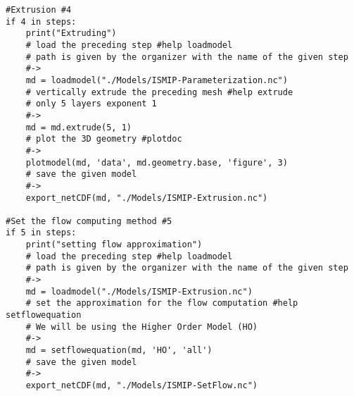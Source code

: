 \begin{verbatim}
#Extrusion #4
if 4 in steps:
    print("Extruding")
    # load the preceding step #help loadmodel
    # path is given by the organizer with the name of the given step
    #->
    md = loadmodel("./Models/ISMIP-Parameterization.nc")
    # vertically extrude the preceding mesh #help extrude
    # only 5 layers exponent 1
    #->
    md = md.extrude(5, 1)
    # plot the 3D geometry #plotdoc
    #->
    plotmodel(md, 'data', md.geometry.base, 'figure', 3)
    # save the given model
    #->
    export_netCDF(md, "./Models/ISMIP-Extrusion.nc")

#Set the flow computing method #5
if 5 in steps:
    print("setting flow approximation")
    # load the preceding step #help loadmodel
    # path is given by the organizer with the name of the given step
    #->
    md = loadmodel("./Models/ISMIP-Extrusion.nc")
    # set the approximation for the flow computation #help setflowequation
    # We will be using the Higher Order Model (HO)
    #->
    md = setflowequation(md, 'HO', 'all')
    # save the given model
    #->
    export_netCDF(md, "./Models/ISMIP-SetFlow.nc")


\end{verbatim}
